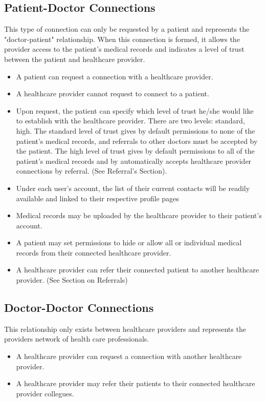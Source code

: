 \documentclass[10pt]{report}
\begin{document}
\subsection{Patient-Doctor Connections}
This type of connection can only be requested by a patient and represents the "doctor-patient" relationship.  When this connection is formed, it allows the provider access to the patient's medical records and indicates a level of trust between the patient and healthcare provider.
\begin{itemize}
\item A patient can request a connection with a healthcare provider. 
\item A healthcare provider cannot request to connect to a patient. 
\item Upon request, the patient can specify which level of trust he/she would like to establish with the healthcare provider. There are two levels: standard, high. The standard level of trust gives by default permissions to none of the patient's medical records, and referrals to other doctors must be accepted by the patient. The high level of trust gives by default permissions to all of the patient's medical records and by automatically accepts healthcare provider connections by referral. (See Referral's Section). 
\item Under each user's account, the list of their current contacts will be readily available and linked to their respective profile pages
\item Medical records may be uploaded by the healthcare provider to their patient's account. 
\item A patient may set permissions to hide or allow all or individual medical records from their connected healthcare provider. 
\item A healthcare provider can refer their connected patient to another healthcare provider. (See Section on Referrals)
\end{itemize} 

\subsection{Doctor-Doctor Connections}
This relationship only exists between healthcare providers and represents the providers network of health care professionals.
\begin{itemize}
\item A healthcare provider can request a connection with another healthcare provider. 
\item A healthcare provider may refer their patients to their connected healthcare provider collegues. 
\end{itemize} 
\end{document}

